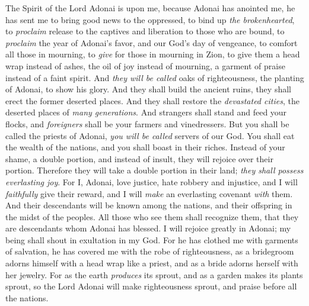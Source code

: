 \begin{biblechapter} %
 The Spirit of the Lord Adonai is upon me, 
because Adonai has anointed me, 
he has sent me to bring good news to the oppressed, 
to bind up \textit{the brokenhearted}, 
to \textit{proclaim} release to the captives 
and liberation to those who are bound,
\verse to \textit{proclaim} the year of Adonai’s favor, 
and our God’s day of vengeance, 
to comfort all those in mourning,
\verse to \textit{give} for those in mourning in Zion, 
to give them a head wrap instead of ashes, 
the oil of joy instead of mourning, 
a garment of praise instead of a faint spirit. 
And \textit{they will be called} oaks of righteousness, 
the planting of Adonai, to show his glory.
\verse And they shall build the ancient ruins, 
they shall erect the former deserted places. 
And they shall restore the \textit{devastated cities}, 
the deserted places of \textit{many generations}.
\verse And strangers shall stand and feed your flocks, 
and \textit{foreigners} shall be your farmers and vinedressers.
\verse But you shall be called the priests of Adonai, 
\textit{you will be called} servers of our God. 
You shall eat the wealth of the nations, 
and you shall boast in their riches.
\verse Instead of your shame, a double portion, 
and instead of insult, they will rejoice over their portion. 
Therefore they will take a double portion in their land; 
\textit{they shall possess everlasting joy}.
\verse For I, Adonai, love justice, 
hate robbery and injustice, 
and I will \textit{faithfully} give their reward, 
and I will \textit{make} an everlasting covenant \textit{with} them.
\verse And their descendants will be known among the nations, 
and their offspring in the midst of the peoples. 
All those who see them shall recognize them, 
that they are descendants whom Adonai has blessed.
\verse I will rejoice greatly in Adonai; 
my being shall shout in exultation in my God. 
For he has clothed me with garments of salvation, 
he has covered me with the robe of righteousness, 
as a bridegroom adorns himself with a head wrap like a priest, 
and as a bride adorns herself with her jewelry.
\verse For as the earth \textit{produces} its sprout, 
and as a garden makes its plants sprout, 
so the Lord Adonai will make righteousness sprout, 
and praise before all the nations.
\end{biblechapter}

